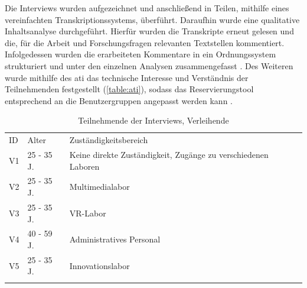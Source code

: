 Die Interviews wurden aufgezeichnet und anschließend in Teilen, mithilfe eines
vereinfachten Transkriptionssystems, überführt. Daraufhin wurde eine qualitative Inhaltsanalyse
durchgeführt. Hierfür wurden die Transkripte erneut gelesen und die, für die Arbeit und
Forschungsfragen relevanten Textstellen kommentiert. Infolgedessen wurden die erarbeiteten
Kommentare in ein Ordnungssystem strukturiert und unter den einzelnen Analysen zusammengefasst
\cite{dresing_praxisbuch_2016}. Des Weiteren wurde mithilfe des \ac{ati} das technische Interesse
und Verständnis der Teilnehmenden festgestellt (\ref{table:ati}), sodass das Reservierungstool
entsprechend an die Benutzergruppen angepasst werden kann \cite{attig_assessing_2017}.

\begin{table}[h]
        \centering
        \caption{Teilnehmende der Interviews, Verleihende}
        \begin{tabular}{lll}
                \arrayrulecolor{maincolor}\hline
                \sffamily\color{maincolor}ID & \sffamily\color{maincolor}Alter &
                \sffamily\color{maincolor}Zuständigkeitsbereich                                   \\
                \arrayrulecolor{maincolor}\hline
                V1                           & 25 - 35 J.                      & Keine direkte
                Zuständigkeit, Zugänge zu verschiedenen Laboren                                   \\
                V2                           & 25 - 35 J.                      & Multimedialabor  \\
                V3                           & 25 - 35 J.                      & VR-Labor         \\
                V4                           & 40 - 59 J.                      & Administratives
                Personal                                                                          \\
                V5                           & 25 - 35 J.                      & Innovationslabor \\
                \arrayrulecolor{maincolor}\hline
        \end{tabular}
        \label{table:v}
\end{table}

